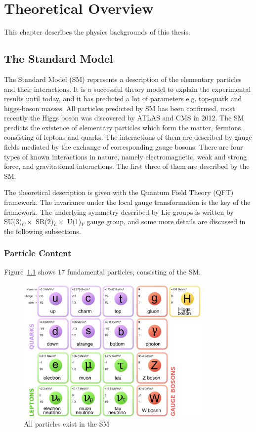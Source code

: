 \chapter{Theoretical Overview}
\label{chap:theory}
This chapter describes the physics backgrounds of this thesis.

\section{The Standard Model}
\label{sec:SM}

The Standard Model (SM) represents a description of the elementary particles and their interactions.
It is a successful theory model to explain the experimental results until today, and it has predicted a lot of parameters e.g. top-quark and higgs-boson masses.
All particles predicted by SM has been confirmed, most recently the Higgs boson was discovered by ATLAS and CMS in 2012.
The SM predicts the existence of elementary particles which form the matter, fermions, consisting of leptons and quarks.
The interactions of them are described by gauge fields mediated by the exchange of corresponding gauge bosons.
There are four types of known interactions in nature, namely electromagnetic, weak and strong force, and gravitational interactions.
The first three of them are described by the SM.

The theoretical description is given with the Quantum Field Theory (QFT) framework. 
The invariance under the local gauge transformation is the key of the framework. 
The underlying symmetry described by Lie groups is written by SU(3)$_C \times$ SR(2)$_L \times$ U(1)$_Y$ gauge group, and some more details are discussed in the following subsections. 

\subsection{Particle Content}
Figure~\ref{fig:SM} shows 17 fundamental particles, consisting of the SM.
\begin{figure}[tbp]
\begin{center}
 \includegraphics[width=0.85\textwidth,keepaspectratio]{figures/SM}
\caption{
All particles exist in the SM %
}
\label{fig:SM}
\end{center}
\end{figure}

